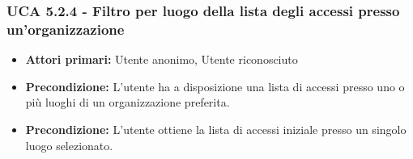 \subsubsection{UCA 5.2.4 - Filtro per luogo della lista degli accessi presso un'organizzazione}
\begin{itemize}
    \item \textbf{Attori primari:} Utente anonimo, Utente riconosciuto
    \item \textbf{Precondizione:} L'utente ha a disposizione una lista di accessi presso uno o più luoghi di un organizzazione preferita.
    \item \textbf{Precondizione:} L'utente ottiene la lista di accessi iniziale presso un singolo luogo selezionato.
\end{itemize}